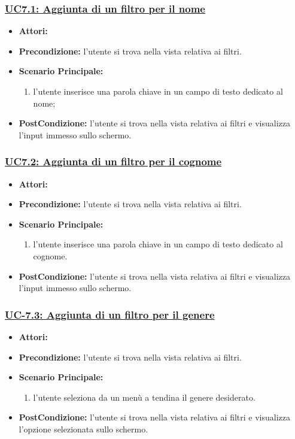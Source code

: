 \subsubsection{\underline{UC7.1: Aggiunta di un filtro per il nome}}
\begin{itemize}
\item \textbf{Attori:}\loggedusr
\item \textbf{Precondizione:} l'utente si trova nella vista relativa ai filtri.
\item \textbf{Scenario Principale:}
\begin{enumerate}
	\item l'utente inserisce una parola chiave in un campo di testo dedicato al nome;
\end{enumerate}
\item \textbf{PostCondizione:}  l'utente si trova nella vista relativa ai filtri e visualizza l'input immesso sullo schermo.
\end{itemize}

\subsubsection{\underline{UC7.2: Aggiunta di un filtro per il cognome}}
\begin{itemize}
	\item \textbf{Attori:}\loggedusr
	\item \textbf{Precondizione:} l'utente si trova nella vista relativa ai filtri.
	\item \textbf{Scenario Principale:}
	\begin{enumerate}
		\item l'utente inserisce una parola chiave in un campo di testo dedicato al cognome.
	\end{enumerate}
	\item \textbf{PostCondizione:}  l'utente si trova nella vista relativa ai filtri e visualizza l'input immesso sullo schermo.
\end{itemize}

\subsubsection{\underline{UC-7.3: Aggiunta di un filtro per il genere}}
\begin{itemize}
	\item \textbf{Attori:}\loggedusr
	\item \textbf{Precondizione:} l'utente si trova nella vista relativa ai filtri.
	\item \textbf{Scenario Principale:}
	\begin{enumerate}
		\item l'utente seleziona da un menù a tendina il genere desiderato.
	\end{enumerate}
	\item \textbf{PostCondizione:}  l'utente si trova nella vista relativa ai filtri e visualizza l'opzione selezionata sullo schermo.
\end{itemize}

